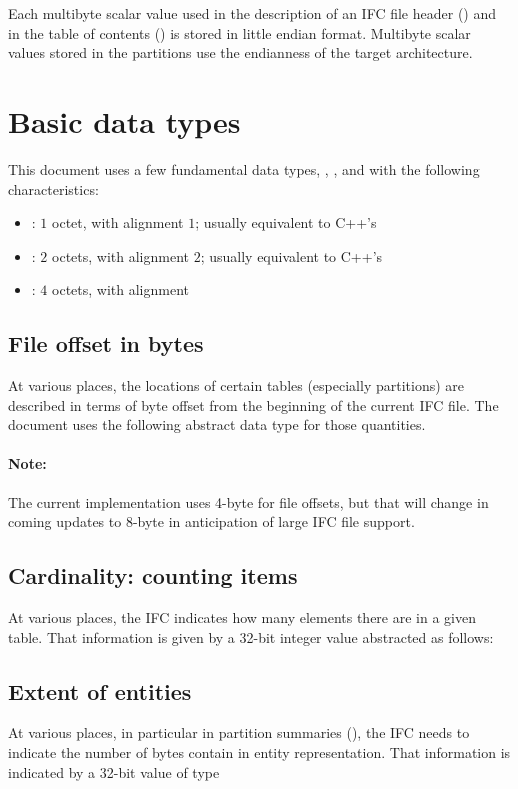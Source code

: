Each multibyte scalar value used in the description of an IFC file header ()
and in the table of contents ()
is stored in little endian format. Multibyte scalar values stored in the partitions use the
endianness of the target architecture.

\section{Basic data types}
\label{sec:ifc-basic-data-types}

This document uses a few fundamental data types, , , and  with the following characteristics:
\begin{itemize}
	\item {}: $1$ octet, with alignment $1$; usually equivalent to C++'s 
	\item {}: $2$ octets, with alignment $2$; usually equivalent to C++'s 
	\item {}: $4$ octets, with alignment %
\end{itemize} 

\subsection{File offset in bytes}
At various places, the locations of certain tables (especially partitions) are
described in terms of byte offset from the beginning of the current IFC file.  The
document uses the following abstract data type for those quantities.

\paragraph{Note:}
The current implementation uses 4-byte for file offsets, but that will change
in coming updates to 8-byte in anticipation of large IFC file support.

\subsection{Cardinality: counting items}
At various places, the IFC indicates how many elements there are in a given
table.  That information is given by a 32-bit integer value abstracted as
follows: 

\subsection{Extent of entities}
\label{sec:ifc-entity-size}
At various places, in particular in partition summaries (), the IFC needs to indicate 
the number of bytes contain in entity representation.  That information is
indicated by a 32-bit value of type 

